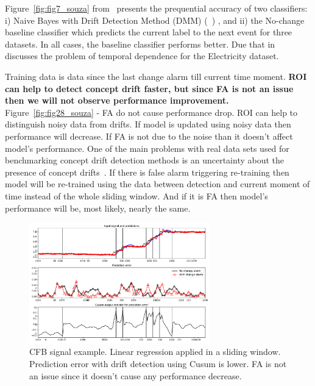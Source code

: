 Figure~\ref{fig:fig7_souza} from~\cite{SouzaRMB20} presents the prequential accuracy of two classifiers: i) Naive Bayes with Drift Detection Method (DMM) (~\cite{gama2004learning}) , and ii) the No-change baseline classifier which predicts the current label to the next event for three datasets. In all cases, the baseline classifier performs better.
Due that in~\cite{zliobaite2013good} discusses the problem of temporal dependence for the Electricity dataset.

Training data is data since the last change alarm till current time moment.
\textbf{ROI can help to detect concept drift faster, but since FA is not an issue then we will not observe performance improvement.}
Figure~\ref{fig:fig28_souza} - FA do not cause performance drop.
ROI can help to distinguish noisy data from drifts. If model is updated using noisy data then performance will decrease.
If FA is not due to the noise than it doesn't affect model's performance. 
One of the main problems with real data sets used for benchmarking concept drift detection methods is an uncertainty about the presence of concept drifts~\cite{SouzaRMB20}.
If there is false alarm triggering re-training then model will be re-trained using the data between detection and current moment of time instead of the whole sliding window.
And if it is FA then model's performance will be, most likely, nearly the same.

\begin{figure}[!htb]
	\centering
	\includegraphics[width=0.7\textwidth]{images/proof_of_concept_linreg_cfb_sig}
	\caption{CFB signal example.  Linear regression applied in a sliding window.  Prediction error with drift detection using Cusum is lower.  FA is not an issue since it doesn't cause any performance decrease.}\label{fig:cfb_sig_linreg_proof_of_concept}
\end{figure}

